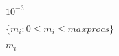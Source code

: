 \documentclass{article}
\begin{document}
$10^{-3}$
\pagebreak

$\{m_i : 0 \leq m_i \leq maxprocs \}$
\pagebreak

$ m_i $
\pagebreak
\end{document}
